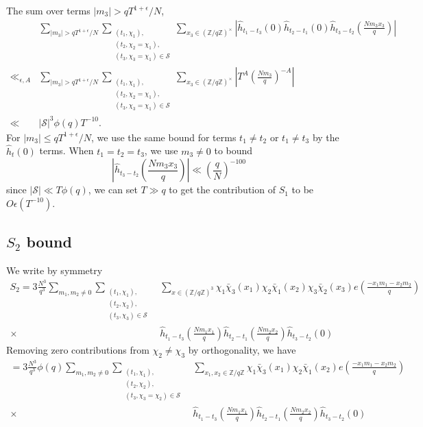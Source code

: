 The sum over terms $|m_3|>qT^{1+\epsilon}/N$,
\begin{align*}
   & \sum_{|m_3|>qT^{1+\epsilon}/N}\sum_{\substack{(t_1,\chi_1),\\(t_2,\chi_2=\chi_1),\\(t_3,\chi_3=\chi_1)\in\mathcal{S}}} \sum_{x_3\in (\mathbb{Z}/q\mathbb{Z})^{\times}}
   \left|\hat{h}_{t_1-t_3}\left(0\right)\hat{h}_{t_2-t_1}\left(0\right)\hat{h}_{t_3-t_2}\left(\frac{Nm_3x_3}{q}\right)\right|\\
    \ll_{\epsilon,A} & \sum_{|m_3|>qT^{1+\epsilon}/N}\sum_{\substack{(t_1,\chi_1),\\(t_2,\chi_2=\chi_1),\\(t_3,\chi_3=\chi_1)\in\mathcal{S}}} \sum_{x_3\in (\mathbb{Z}/q\mathbb{Z})^{\times}}
    \left|T^{A}\left(\frac{Nm_3}{q} \right)^{-A}\right|\\
    \ll & |\mathcal{S}|^3\phi(q) T^{-10}.
\end{align*}
For $|m_3|\leq qT^{1+\epsilon}/N$, we use the same bound for terms $t_1\neq t_2$ or $t_1\neq t_3$ by the $\hat{h}_t(0)$ terms. When $t_1=t_2=t_3$, we use $m_3\neq 0$
to bound \[
    \left|\hat{h}_{t_3-t_2}\left(\frac{Nm_3x_3}{q}\right)\right| \ll \left(\frac{q}{N}\right)^{-100}
\]
since $|\mathcal{S}|\ll T\phi(q)$, we can set $T\gg q$ to get the contribution of $S_1$ to be $O\epsilon(T^{-10})$.
\subsection{$S_2$ bound}
We write by symmetry \begin{align*}
    S_2= 3\frac{N^3}{q^3}\sum_{m_1,m_2\neq 0}\sum_{\substack{(t_1,\chi_1),\\(t_2,\chi_2),\\(t_3,\chi_3)\in\mathcal{S}}} &\sum_{x\in (\mathbb{Z}/q\mathbb{Z})^3}\chi_1\bar{\chi}_3(x_1)\chi_2\bar{\chi}_1(x_2)\chi_3\bar{\chi}_2(x_3) e\left(\frac{-x_1m_1-x_2m_2}{q}\right)\\
    \times \ &\hat{h}_{t_1-t_3}\left(\frac{Nm_1x_1}{q}\right)\hat{h}_{t_2-t_1}\left(\frac{Nm_2x_2}{q}\right)\hat{h}_{t_3-t_2}\left(0\right)
\end{align*}
Removing zero contributions from $\chi_2\neq \chi_3$ by orthogonality,
we have \begin{align*}
    =3\frac{N^3}{q^3} \phi(q) \sum_{m_1,m_2\neq 0}\sum_{\substack{(t_1,\chi_1),\\(t_2,\chi_2),\\(t_3,\chi_3=\chi_2)\in\mathcal{S}}} &\sum_{x_1,x_2 \in \mathbb{Z}/q\mathbb{Z}}\chi_1\bar{\chi}_3(x_1)\chi_2\bar{\chi}_1(x_2) e\left(\frac{-x_1m_1-x_2m_2}{q}\right)\\
    \times \ &\hat{h}_{t_1-t_3}\left(\frac{Nm_1x_1}{q}\right)\hat{h}_{t_2-t_1}\left(\frac{Nm_2x_2}{q}\right)\hat{h}_{t_3-t_2}\left(0\right)
\end{align*}